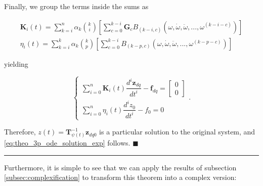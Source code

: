 	Finally, we group the terms inside the sums as

\begin{gather}
	\mathbf{K}_i(t) = \sum\limits_{k=i}^{n} \alpha_k{k\choose i} \left[\sum\limits_{c=0}^{k-i} \mathbf{G}_c B_{\left(k-i,c\right)}\left(\omega,\dot{\omega},\ddot{\omega},...,\omega^{(k-i-c)}\right) \right] \\[3mm]
	\eta_i(t) = \sum\limits_{k=i}^{k} \alpha_k {k\choose p} \left[\sum\limits_{c=0}^{k-i} B_{\left(k-p,c\right)}\left(\omega,\dot{\omega},\ddot{\omega},...,\omega^{(k-p-c)}\right)\right] 
\end{gather}

	yielding

\begin{equation}
\left\{\begin{array}{l}
	\displaystyle \sum\limits_{i=0}^n \mathbf{K}_i (t) \dfrac{d^i \mathbf{z}_{dq}}{dt^i} - \mathbf{f}_{dq}  = \left[\begin{array}{c} 0 \\[3mm] 0 \end{array}\right]\\[5mm]
	\displaystyle \sum\limits_{i=0}^n \eta_i(t) \dfrac{d^i z_0}{dt^i} - f_0 = 0
\end{array}\right. .
\end{equation}

	Therefore, $z(t) = \mathbf{T}^{-1}_{\psi(t)}\mathbf{z}_{dq0}$ is a particular solution to the original system, and \eqref{eq:theo_3p_ode_solution_exp} follows. \hfill$\blacksquare$

\vspace{5mm}
\hrule
\vspace{5mm}

	Furthermore, it is simple to see that we can apply the results of subsection \ref{subsec:complexification} to transform this theorem into a complex version:

